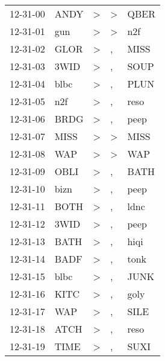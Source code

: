 \begin{supertabular}{lllll}
 12-31-00 &  ANDY &  \textgreater &  \textgreater &  QBER \\
 12-31-01 &   gun &  \textgreater &  \textgreater &   n2f \\
 12-31-02 &  GLOR &  \textgreater &             , &  MISS \\
 12-31-03 &  3WID &  \textgreater &             , &  SOUP \\
 12-31-04 &  blbc &  \textgreater &             , &  PLUN \\
 12-31-05 &   n2f &  \textgreater &             , &  reso \\
 12-31-06 &  BRDG &  \textgreater &             , &  peep \\
 12-31-07 &  MISS &  \textgreater &  \textgreater &  MISS \\
 12-31-08 &   WAP &  \textgreater &  \textgreater &   WAP \\
 12-31-09 &  OBLI &  \textgreater &             , &  BATH \\
 12-31-10 &  bizn &  \textgreater &             , &  peep \\
 12-31-11 &  BOTH &  \textgreater &             , &  ldnc \\
 12-31-12 &  3WID &  \textgreater &             , &  peep \\
 12-31-13 &  BATH &  \textgreater &             , &  hiqi \\
 12-31-14 &  BADF &  \textgreater &             , &  tonk \\
 12-31-15 &  blbc &  \textgreater &             , &  JUNK \\
 12-31-16 &  KITC &  \textgreater &             , &  goly \\
 12-31-17 &   WAP &  \textgreater &             , &  SILE \\
 12-31-18 &  ATCH &  \textgreater &             , &  reso \\
 12-31-19 &  TIME &  \textgreater &             , &  SUXI \\
\end{supertabular}
